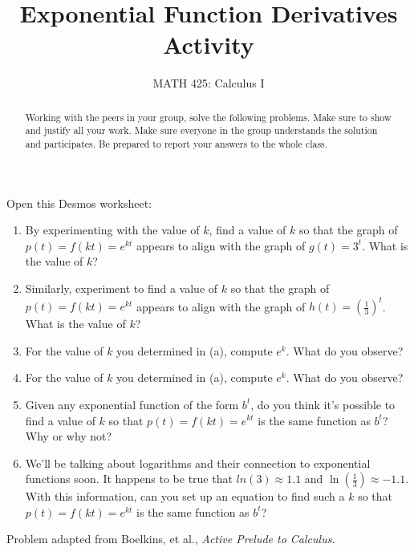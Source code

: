 \documentclass{ximera}
\title{Exponential Function Derivatives Activity}
\author{MATH 425: Calculus I}
\begin{document}
\begin{abstract}
    Working with the peers in your group, solve the following problems. Make sure to show and justify all your work. Make sure everyone in the group understands the solution and participates. Be prepared to report your answers to the whole class. 
\end{abstract}
\maketitle


\begin{exercise}
    Open this Desmos worksheet: \\
    \begin{center}
    \end{center}

    \begin{enumerate}
        \item By experimenting with the value of $k$, find a value of $k$ so that the graph of $p(t)=f(kt)=e^{kt}$ appears to align with the graph of $g(t)=3^t$.  What is the value of $k$?
   
        \item Similarly, experiment to find a value of $k$ so that the graph of $p(t)=f(kt)=e^{kt}$ appears to align with the graph of $h(t)=(\frac13)^t$.  What is the value of $k$?
   
        \item For the value of $k$ you determined in (a), compute $e^k$.  What do you observe? 
   
        \item For the value of $k$ you determined in (a), compute $e^k$.  What do you observe?  
   
        \item Given any exponential function of the form $b^t$, do you think it's possible to find a value of $k$ so that $p(t)=f(kt)=e^{kt}$ is the same function as $b^t$?  Why or why not?
   
        \item  We'll be talking about logarithms and their connection to exponential functions soon. 
        It happens to be true that $ln(3)\approx 1.1$ and $\ln(\frac{1}{3})\approx -1.1$. With this information, can you set up an equation to find such a $k$ so that $p(t)=f(kt)=e^{kt}$ is the same function as $b^t$? \\
   
   
    \end{enumerate}  
   
    Problem adapted from Boelkins, et al., \textit{Active Prelude to Calculus}.
\end{exercise}
\end{document}
